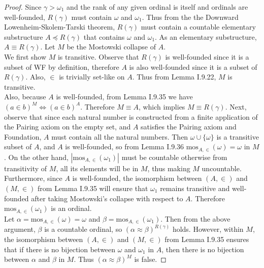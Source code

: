 \documentclass{article}
\begin{document}
  \begin{proof}
    Since $\gamma>\omega_1$ and the rank of any given ordinal is itself and
    ordinals are well-founded, $R(\gamma)$ must contain $\omega$ and
    $\omega_1$. Thus from the the Downward Lowenheim-Skolem-Tarski theorem,
    $R(\gamma)$ must contain a countable elementary substructure $A\preceq
    R(\gamma)$ that contains $\omega$ and $\omega_1$. As an elementary
    substructure, $A\equiv R(\gamma)$. Let $M$ be the Mostowski collapse of
    $A$. \\

    We first show $M$ is transitive. Observe that $R(\gamma)$ is
    well-founded since it is a subset of WF by definition, therefore $A$ is
    also well-founded since it is a subset of $R(\gamma)$. Also, $\in$ is
    trivially set-like on $A$. Thus from Lemma I.9.22, $M$ is
    transitive. \\

    Also, because $A$ is well-founded, from Lemma I.9.35 we have $(a\in
    b)^M \Leftrightarrow (a\in b)^A$. Therefore $M\equiv A$, which implies
    $M\equiv R(\gamma)$. Next, observe that since each natural number is
    constructed from a finite application of the Pairing axiom on the empty
    set, and $A$ satisfies the Pairing axiom and Foundation, $A$ must
    contain all the natural numbers. Then $\omega\cup\{\omega\}$ is a
    transitive subset of $A$, and $A$ is well-founded, so from Lemma I.9.36
    $\text{mos}_{A,\in}(\omega)=\omega$ in $M$. On the other hand,
    $|\text{mos}_{A,\in}(\omega_1)|$ must be countable otherwise from
    transitivity of $M$, all its elements will be in $M$, thus making $M$
    uncountable. Furthermore, since $A$ is well-founded, the isomorphism
    between $(A,\in)$ and $(M,\in)$ from Lemma I.9.35 will ensure that
    $\omega_1$ remains transitive and well-founded after taking Mostowski's
    collapse with respect to $A$. Therefore $\text{mos}_{A,\in}(\omega_1)$
    is an ordinal. \\

    Let $\alpha=\text{mos}_{A,\in}(\omega)=\omega$ and
    $\beta=\text{mos}_{A,\in}(\omega_1)$. Then from the above argument,
    $\beta$ is a countable ordinal, so $(\alpha\approx\beta)^{R(\gamma)}$
    holds. However, within $M$, the isomorphism between $(A,\in)$ and
    $(M,\in)$ from Lemma I.9.35 ensures that if there is no bijection
    between $\omega$ and $\omega_1$ in $A$, then there is no bijection
    between $\alpha$ and $\beta$ in $M$. Thus
    $(\alpha\approx\beta)^{M}$ is false.
  \end{proof}
\end{document}
